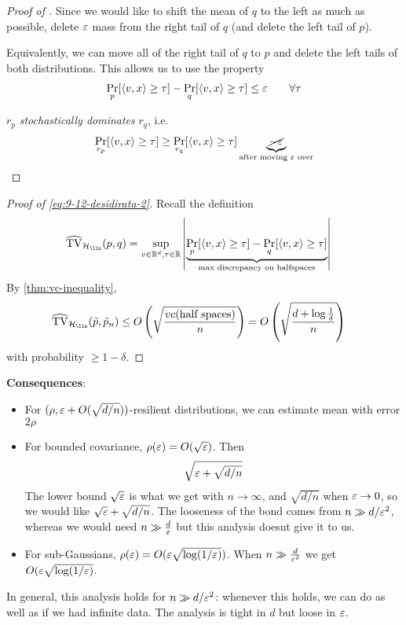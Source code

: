 \begin{proof}[Proof of ]
    Since we would like to shift the mean of $q$ to the left as much
    as possible, delete $\varepsilon$ mass from the right tail of $q$ (and delete the left tail of $p$).
    
    Equivalently, we can move all of the right tail of $q$ to $p$ and delete
    the left tails of both distributions.
    This allows us to use the property
    \begin{align}
        \Pr_p[\braket{v,x} \geq \tau] - \Pr_q[\braket{v,x} \geq \tau] \leq \varepsilon \qquad \forall \tau
    \end{align}
    
    $r_p$ \emph{stochastically dominates} $r_q$, i.e.
    \begin{align}
        \Pr_{r_p}[\braket{v,x} \geq \tau] \geq \Pr_{r_q}[\braket{v,x} \geq \tau] \underbrace{\cancel{-\varepsilon}}_{\text{after moving $\varepsilon$ over}}
    \end{align}
\end{proof}

\begin{proof}[Proof of \cref{eq:9-12-desidirata-2}]
    Recall the definition
    \begin{align}
        \widehat{\TV}_{\cH_{\lin}}(p,q)
        &= \sup_{v \in \RR^d, \tau \in \RR} \left\lvert
            \underbrace{\Pr_p[\braket{v,x} \geq \tau] - \Pr_q[\braket{v,x} \geq \tau]}_{\text{max discrepancy on halfspaces}}
        \right\rvert
    \end{align}
    By \cref{thm:vc-inequality},
    \begin{align}
        \widehat{\TV}_{\cH_{\lin}}(\tilde{p}, \tilde{p}_n)
        &\leq O\left(\sqrt{\frac{vc(\text{half spaces})}{n}}\right)
        = O\left(\sqrt{\frac{d + \log \frac{1}{\delta}}{n}}\right)
    \end{align}
    with probability $\geq 1 - \delta$.
\end{proof}

\textbf{Consequences}:
\begin{itemize}
    \item For $(\rho, \varepsilon + O(\sqrt{d/n}))$-resilient distributions, we can estimate mean with error $2 \rho$
    \item For bounded covariance, $\rho(\varepsilon) = O(\sqrt{\varepsilon})$. Then
    \begin{align}
        \sqrt{\varepsilon + \sqrt{d/n}}
    \end{align}
    The lower bound $\sqrt{\varepsilon}$ is what we get with $n \to \infty$,
    and $\sqrt{d/n}$ when $\varepsilon \to 0$, so we would like $\sqrt{\varepsilon} + \sqrt{d/n}$.
    The looseness of the bond comes from $n \gg d / \varepsilon^2$, whereas we would need $n \gg \frac{d}{\varepsilon}$ but this analysis doesnt give it to us.
    
    \item For sub-Gaussians, $\rho(\varepsilon) = O(\varepsilon \sqrt{\log(1/\varepsilon)})$.
    When $n \gg \frac{d}{\varepsilon^2}$ we get $O(\varepsilon \sqrt{\log (1/\varepsilon)}$.
\end{itemize}
In general, this analysis holds for $n \gg d / \varepsilon^2$: whenever this holds, we can
do as well as if we had infinite data. The analysis is tight in $d$ but loose in $\varepsilon$.


